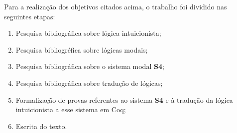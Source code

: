 Para a realização dos objetivos citados acima, o trabalho foi dividido nas seguintes etapas:

\begin{enumerate}
    \item Pesquisa bibliográfica sobre lógica intuicionista;
    \item Pesquisa bibliogréfica sobre lógicas modais;
    \item Pesquisa bibliográfica sobre o sistema modal \textbf{S4};
    \item Pesquisa bibliográfica sobre tradução de lógicas;
    \item Formalização de provas referentes ao sistema \textbf{S4} e à tradução da lógica intuicionista a esse sistema em Coq;
    \item Escrita do texto.
\end{enumerate}

